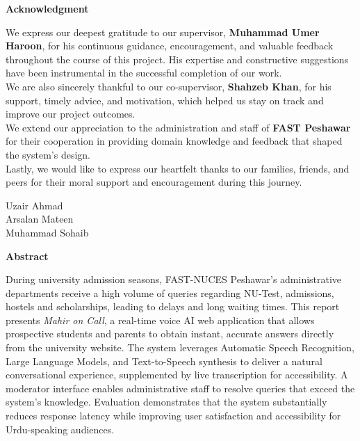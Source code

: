 \documentclass[12pt,a4paper]{report}
\begin{document}
\newpage
\thispagestyle{plain}
\begin{center}
  {\Large \textbf{Acknowledgment}}\\[1cm]
\end{center}

\noindent We express our deepest gratitude to our supervisor,
\textbf{Muhammad Umer Haroon}, for his continuous guidance,
encouragement, and valuable feedback throughout the course of this project.
His expertise and constructive suggestions have been instrumental in the
successful completion of our work.\\[0.5cm]

\noindent We are also sincerely thankful to our co-supervisor, \textbf{Shahzeb
Khan}, for his support, timely advice, and motivation, which helped us stay on
track and improve our project outcomes.\\[0.5cm]

\noindent We extend our appreciation to the administration and staff of
\textbf{FAST Peshawar} for their cooperation in providing domain knowledge and
feedback that shaped the system's design.\\[0.5cm]

\noindent Lastly, we would like to express our heartfelt thanks to our
families, friends, and peers for their moral support and encouragement during
this journey.\\[1.2cm]

\begin{flushright}
  Uzair Ahmad\\
  Arsalan Mateen\\
  Muhammad Sohaib
\end{flushright}

\newpage
\thispagestyle{plain}
\begin{center}
  {\Large \textbf{Abstract}}\\[1cm]
\end{center}

\noindent During university admission seasons, FAST-NUCES Peshawar's administrative departments receive a high volume of queries regarding NU-Test, admissions, hostels and scholarships, leading to delays and long waiting times. This report presents \textit{Mahir on Call}, a real-time voice AI web application that allows prospective students and parents to obtain instant, accurate answers directly from the university website. The system leverages Automatic Speech Recognition, Large Language Models, and
Text-to-Speech synthesis to deliver a natural conversational experience,
supplemented by live transcription for accessibility. A moderator interface
enables administrative staff to resolve queries that exceed the system's
knowledge. Evaluation demonstrates that the system substantially reduces
response latency while improving user satisfaction and accessibility for
Urdu-speaking audiences.
\end{document}
